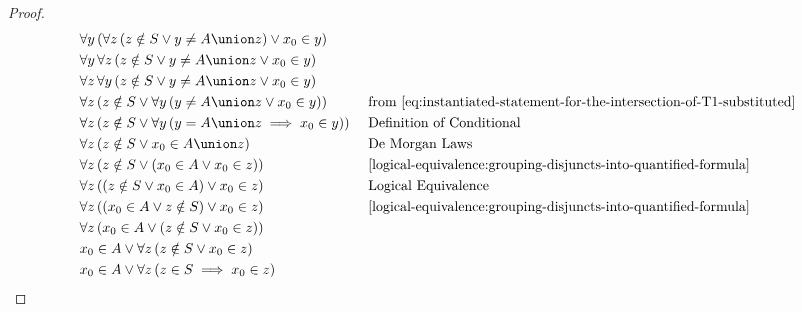 \begin{proof}
\begin{equation*}
\begin{aligned}
            &\forall y \, \mleft( \forall z \, \mleft( z \notin S \lor y \neq A \union z \mright) \lor x_{0} \in y \mright)\\
            &\forall y \, \forall z \, \mleft( z \notin S \lor y \neq A \union z \lor x_{0} \in y \mright)\\
            &\forall z \, \forall y \, \mleft( z \notin S \lor y \neq A \union z \lor x_{0} \in y \mright)\\
            &\forall z \, \mleft( z \notin S \lor \forall y \, \mleft( y \neq A \union z \lor x_{0} \in y \mright) \mright)\\
            &\forall z \, \mleft( z \notin S \lor \forall y \, \mleft( y = A \union z \implies x_{0} \in y \mright) \mright)\\
            &\forall z \, \mleft( z \notin S \lor x_{0} \in A \union z \mright)\\
            &\forall z \, \mleft( z \notin S \lor \mleft( x_{0} \in A \lor x_{0} \in z \mright) \mright)\\
            &\forall z \, \mleft( \mleft( z \notin S \lor x_{0} \in A \mright) \lor x_{0} \in z \mright)\\
            &\forall z \, \mleft( \mleft( x_{0} \in A \lor z \notin S \mright) \lor x_{0} \in z \mright)\\
            &\forall z \, \mleft( x_{0} \in A \lor \mleft( z \notin S \lor x_{0} \in z \mright) \mright)\\
            &x_{0} \in A \lor \forall z \, \mleft( z \notin S \lor x_{0} \in  z \mright)\\
            &x_{0} \in A \lor \forall z \, \mleft( z \in S \implies x_{0} \in z \mright)\\
        \end{aligned}
        \text{  }
        \begin{aligned}
            &\quad \text{from \eqref{eq:instantiated-statement-for-the-intersection-of-T1-substituted}}\\
            &\quad \text{Definition of Conditional}\\
            &\quad \text{De Morgan Laws}\\
            &\quad \text{\cref{logical-equivalence:grouping-disjuncts-into-quantified-formula}}\\
            &\quad \text{Logical Equivalence}\\
            &\quad \text{\cref{logical-equivalence:grouping-disjuncts-into-quantified-formula}}\\

\end{aligned}
\end{equation*}
\end{proof}
